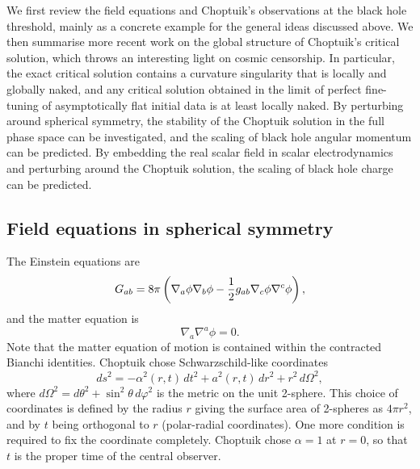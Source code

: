\documentclass{article}
\begin{document}
We first review the field equations and Choptuik's observations at
the black hole threshold, mainly as a concrete example for the general
ideas discussed above. We then summarise more recent work on the
global structure of Choptuik's critical solution, which throws an
interesting light on cosmic censorship. In particular, the exact
critical solution contains a curvature singularity that is locally and
globally naked, and any critical solution obtained in the limit of
perfect fine-tuning of asymptotically flat initial data is at least
locally naked. By perturbing around spherical symmetry, the
stability of the Choptuik solution in the full phase space can be
investigated, and the scaling of black hole angular momentum can be
predicted. By embedding the real scalar field in scalar
electrodynamics and perturbing around the Choptuik solution, the
scaling of black hole charge can be predicted.


\subsection{Field equations in spherical symmetry}
\label{section:scalarfieldequations}

The Einstein equations are
%
\begin{equation}
  \label{scalar_stress_energy}
  G_{ab} = 8 \pi \left(\nabla_a \phi \nabla_b \phi - {1\over 2} g_{ab}
  \nabla_c \phi \nabla^c \phi\right),
\end{equation}
%
and the matter equation is
%
\begin{equation}
  \nabla_a \nabla^a \phi = 0.
\end{equation}
%
Note that the matter equation of motion is contained within the
contracted Bianchi identities. Choptuik chose Schwarzschild-like
coordinates 
%
\begin{equation}
  \label{tr_metric}
  ds^2 = - \alpha^2(r, t) \, dt^2 + a^2(r, t) \, dr^2 + r^2 \, d\Omega^2,
\end{equation}
%
where $d\Omega^2 = d\theta^2 + \sin^2\theta \, d\varphi^2$ is the
metric on the unit 2-sphere. This choice of coordinates is defined by
the radius $r$ giving the surface area of 2-spheres as $4\pi r^2$, and by
$t$ being orthogonal to $r$ (polar-radial coordinates). One more
condition is required to fix the coordinate completely. Choptuik chose
$\alpha=1$ at $r=0$, so that $t$ is the proper time of the central
observer.
\end{document}
